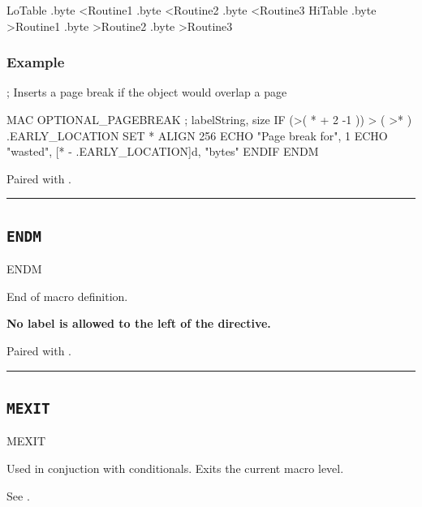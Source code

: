 \begin{code}[caption=Output]
LoTable
	.byte <Routine1
	.byte <Routine2
	.byte <Routine3
HiTable
	.byte >Routine1
	.byte >Routine2
	.byte >Routine3
	
	\end{code}
		
\subsubsection{Example}

\begin{code}
; Inserts a page break if the object would overlap a page

  MAC OPTIONAL_PAGEBREAK ; { labelString, size }
    IF (>( * + {2} -1 )) > ( >* )
.EARLY_LOCATION  SET *
      ALIGN 256
        ECHO "Page break for", {1}
        ECHO "wasted", [* - .EARLY_LOCATION]d, "bytes"
    ENDIF
  ENDM
\end{code}		
		
		
		
Paired with .\\

\hrule

	
\subsection{\texttt{ENDM}}
\label{pseudoop:endm}
	
\begin{usage}
  ENDM
\end{usage}
		
		End of macro definition.
		
		\textbf{No label is allowed to the left of the directive.}

Paired with .\\
		
\hrule
		
\subsection{\texttt{MEXIT}}

\begin{usage}
  MEXIT
\end{usage}

Used in conjuction with conditionals.  Exits the current macro level.

See .


